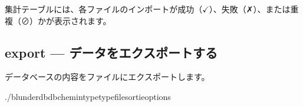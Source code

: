 \documentclass[letterpaper,10pt,dvipdfmx]{sphinxmanual}
\begin{document}
\sphinxAtStartPar
集計テーブルには、各ファイルのインポートが成功（\(\checkmark\)）、失敗（✗）、または重複（⊘）かが表示されます。


\subsection{export — データをエクスポートする}
\label{\detokenize{cli:export-exporter-des-donnees}}
\sphinxAtStartPar
データベースの内容をファイルにエクスポートします。

\begin{sphinxVerbatim}[commandchars=\\\{\}]
./blunderdb\PYGZhy{}\PYGZhy{}db\PYGZlt{}chemin\PYGZgt{}\PYGZhy{}\PYGZhy{}type\PYGZlt{}type\PYGZgt{}\PYGZhy{}\PYGZhy{}file\PYGZlt{}sortie\PYGZgt{}\PYG{o}{[}options\PYG{o}{]}
\end{sphinxVerbatim}
\end{document}

